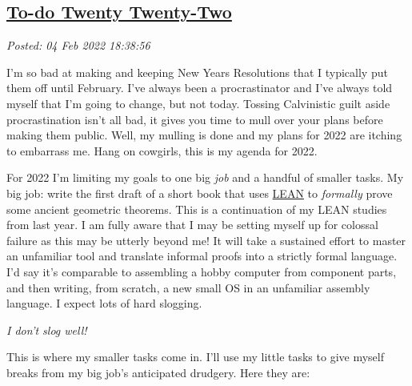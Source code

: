 %

\subsection*{\href{https://analyzethedatanotthedrivel.org/2022/02/04/to-do-twenty-twenty-two/}{To-do Twenty Twenty-Two}}


\noindent\emph{Posted: 04 Feb 2022 18:38:56}
\vspace{6pt}

I'm so bad at making and keeping New Years Resolutions that I typically
put them off until February. I've always been a procrastinator and I've
always told myself that I'm going to change, but not today. Tossing
Calvinistic guilt aside procrastination isn't all bad, it gives you time
to mull over your plans before making them public. Well, my mulling is
done and my plans for 2022 are itching to embarrass me. Hang on
cowgirls, this is my agenda for 2022.

For 2022 I'm limiting my goals to one big \emph{job} and a handful of
smaller tasks. My big job: write the first draft of a short book that
uses \href{https://leanprover-community.github.io/}{LEAN} to
\emph{formally} prove some ancient geometric theorems. This is a
continuation of my LEAN studies from last year. I am fully aware that I
may be setting myself up for colossal failure as this may be utterly
beyond me! It will take a sustained effort to master an unfamiliar tool
and translate informal proofs into a strictly formal language. I'd say
it's comparable to assembling a hobby computer from component parts, and
then writing, from scratch, a new small OS in an unfamiliar assembly
language. I expect lots of hard slogging.

\emph{I don't slog well!}

This is where my smaller tasks come in. I'll use my little tasks to give
myself breaks from my big job's anticipated drudgery. Here they are:

